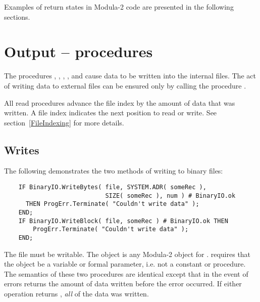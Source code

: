 Examples of return states in Modula-2 code are presented in
the following sections.

\section{Output --  procedures}

The procedures , 
,
, ,
and  cause data to be written into 
the internal files.  The act of writing data to external
files can be ensured only by calling the procedure .

All read procedures advance the file index by the amount of data
that was written.  A file index indicates the next position to read or
write.  See section~\ref{FileIndexing} for more details.


\subsection{ Writes}

The following demonstrates the two methods of writing to binary files:
\begin{verbatim}
    IF BinaryIO.WriteBytes( file, SYSTEM.ADR( someRec ),
                            SIZE( someRec ), num ) # BinaryIO.ok 
      THEN ProgErr.Terminate( "Couldn't write data" );
    END;
    IF BinaryIO.WriteBlock( file, someRec ) # BinaryIO.ok THEN
        ProgErr.Terminate( "Couldn't write data" );
    END;
\end{verbatim}


The file must be writable.  The object  is 
any Modula-2 object for .  
requires that the object be a variable or formal parameter, i.e.
not a constant or procedure.  The semantics of these two procedures
are identical except that in the event of errors 
returns the amount of data written before the error occurred.
If either operation returns , {\em all} of the
data was written.

